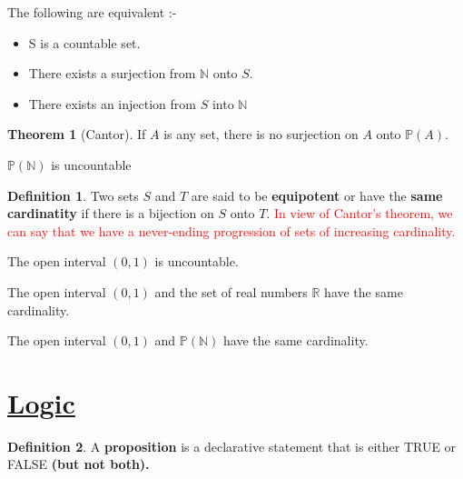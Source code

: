 \documentclass{article}
\theoremstyle{definition}
\newtheorem*{defi}{Definition}
\theoremstyle{definition}
\newenvironment{manualprop}[1]{%
  \renewcommand\themanualpropinner{#1}%
  \manualpropinner
}{\endmanualpropinner}
\newenvironment{manualcoro}[1]{%
  \renewcommand\themanualcoroinner{#1}%
  \manualcoroinner
}{\endmanualcoroinner}
\theoremstyle{named}
\newtheorem*{namedtheorem}{Theorem}
\begin{document}
\begin{manualprop} {25}
    The following are equivalent :-
    \begin{itemize}
        \item S is a countable set.
        \item There exists a surjection from $\mathbb{N}$ onto $S$.
        \item There exists an injection from $S$ into $\mathbb{N}$
    \end{itemize}
\end{manualprop}

\begin{namedtheorem}[Cantor]
    If $A$ is any set, there is no surjection on $A$ onto $\mathbb{P}(A)$.
\end{namedtheorem}

\begin{manualcoro}{5.1}
    $\mathbb{P}(\mathbb{N})$ is uncountable
\end{manualcoro}

\begin{defi}
    Two sets $S$ and $T$ are said to be \textbf{equipotent} or have the \textbf{same cardinatity} if there is a bijection on $S$ onto $T$. \textcolor{red}{In view of Cantor's theorem, we can say that we have a never-ending progression of sets of increasing cardinality. }
\end{defi}

\begin{manualcoro}{5.2}
    The open interval $(0, 1)$ is uncountable.
\end{manualcoro}

\begin{manualcoro}{5.3}
    The open interval $(0, 1)$ and the set of real numbers $\mathbb{R}$ have the same cardinality.
\end{manualcoro}

\begin{manualcoro}{5.4}
    The open interval $(0, 1)$ and  $\mathbb{P}(\mathbb{N})$ have the same cardinality.
\end{manualcoro}


\section{\underline{Logic}}

\begin{defi}
    A \textbf{proposition} is a declarative
statement that is either TRUE or FALSE \textbf{(but not
both).}
\end{defi}
\end{document}
